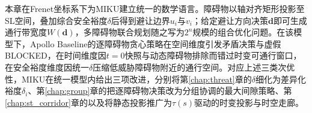 本章在Frenet坐标系下为MIKU建立统一的数学语言。障碍物以轴对齐矩形投影至SL空间，叠加综合安全裕度$\delta$后得到避让边界$u_i$与$v_i$；给定避让方向决策$\mathbf{d}$即可生成通行带宽度$W(\mathbf{d})$，多障碍物联合规划随之写为$2^n$规模的组合优化问题。在该模型下，Apollo Baseline的逐障碍物贪心策略在空间维度引发矛盾决策与虚假BLOCKED，在时间维度因$t{=}0$快照与动态障碍物排除而错过时变可通行窗口，在安全裕度维度因统一$\delta$压缩低威胁障碍物附近的通行空间。对应上述三类次优性，MIKU在统一模型内给出三项改进，分别将第\ref{chap:threat}章的$\delta$细化为差异化裕度$\delta_i$、第\ref{chap:group}章的把逐障碍物决策改为分组协调的最大间隙策略、第\ref{chap:st_corridor}章的以及将静态投影推广为$\tau(s)$驱动的时变投影与时空走廊。

